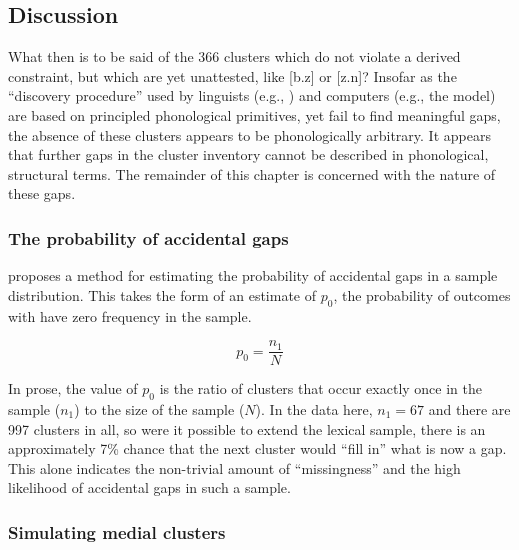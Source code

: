 \subsection{Discussion}

What then is to be said of the 366 clusters which do not violate a derived constraint, but which are yet unattested, like [b.z] or [z.n]?
Insofar as the ``discovery procedure'' used by linguists (e.g., \citeauthor{Pierrehumbert1994}) and computers (e.g., the \citeauthor{Hayes2008a} model) are based on principled phonological primitives, yet fail to find meaningful gaps, the absence of these clusters appears to be phonologically arbitrary.
It appears that further gaps in the cluster inventory cannot be described in phonological, structural terms.
The remainder of this chapter is concerned with the nature of these gaps.

\subsubsection{The probability of accidental gaps}

\citet{Good1953} proposes a method for estimating the probability of accidental gaps in a sample distribution. 
This takes the form of an estimate of $p_0$, the probability of outcomes with have zero frequency in the sample.

\begin{equation*}
\displaystyle p_0 = \frac{n_1}{N}
\end{equation*}

\noindent
In prose, the value of $p_0$ is the ratio of clusters that occur exactly once in the sample ($n_1$) to the size of the sample ($N$). 
In the data here, $n_1 = 67$ and there are 997 clusters in all, so were it possible to extend the lexical sample, there is an approximately 7\% chance that the next cluster would ``fill in'' what is now a gap.
This alone indicates the non-trivial amount of ``missingness'' and the high likelihood of accidental gaps in such a sample.

\subsubsection{Simulating medial clusters}
\label{simulate}

